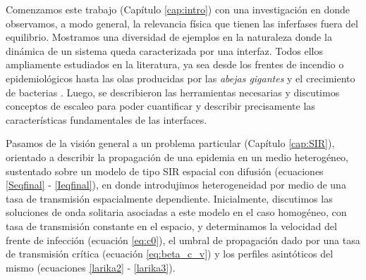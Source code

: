 
Comenzamos este trabajo (Capítulo \ref{cap:intro}) con una investigación en donde observamos, a modo general, la relevancia física que tienen las inferfases fuera del equilibrio. Mostramos una diversidad de ejemplos en la naturaleza donde la dinámica de un sistema queda caracterizada por una interfaz. Todos ellos ampliamente estudiados en la literatura, ya sea desde los frentes de incendio o epidemiológicos hasta las olas producidas por las \textit{abejas gigantes} y el crecimiento de bacterias \cite{zhang1992modeling, provatas1995scaling, PhysRevLett.79.1515, Jullien1992SurfaceD, PhysRevLett.110.035501, kastberger2014speeding, kastberger2013social, kastberger2008social, matsushita1990diffusion, bhattacharjee2022chemotactic, mate_sist_bio, barbieri2020soil, stenseth2008plague}. Luego, se describieron las herramientas necesarias y discutimos conceptos de escaleo para poder cuantificar y describir precisamente las características fundamentales de las interfaces.

Pasamos de la visión general a un problema particular (Capítulo \ref{cap:SIR}), orientado a describir la propagación de una epidemia en un medio heterogéneo, sustentado sobre un modelo de tipo SIR espacial con difusión (ecuaciones \ref{Seqfinal} - \ref{Ieqfinal}), en donde introdujimos heterogeneidad por medio de una tasa de transmisión espacialmente dependiente. Inicialmente, discutimos las soluciones de onda solitaria asociadas a este modelo en el caso homogéneo, con tasa de transmisión constante en el espacio, y determinamos la velocidad del frente de infección (ecuación \ref{eq:c0}), el umbral de propagación dado por una tasa de transmisión crítica (ecuación \ref{eq:beta_c_v}) y los perfiles asintóticos del mismo (ecuaciones \ref{larika2} - \ref{larika3}).

